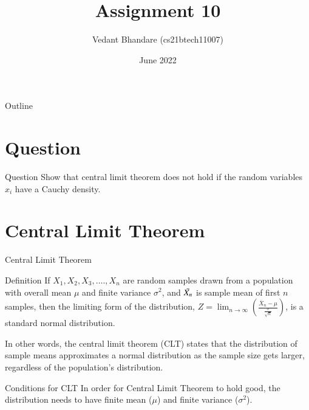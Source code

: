 \documentclass{beamer}
\title{Assignment 10}
\author{Vedant Bhandare (cs21btech11007)}
\date{June 2022}
\begin{document}
\begin{frame}
    \titlepage 
\end{frame}

\logo{}


\begin{frame}{Outline}
    \tableofcontents
\end{frame}

\section{Question}
\begin{frame}{Question}
    Show that central limit theorem does not hold if the random variables $x_i$ have a Cauchy density.
\end{frame}

\section{Central Limit Theorem}
\begin{frame}{Central Limit Theorem}
    \begin{block}{Definition}
    If $X_1, X_2, X_3, ...., X_n$ are random samples drawn from a population with overall mean $\mu$ and finite variance $\sigma^2$, and $\Bar{X_n}$ is sample mean of first $n$ samples, then the limiting form of the distribution, ${\textstyle Z=\lim _{n\to \infty }{\left({\frac {{\bar {X}}_{n}-\mu }{\frac {\sigma }{\sqrt {n}}}}\right)}}$, is a standard normal distribution. 
    \end{block}    
    In other words, the central limit theorem (CLT) states that the distribution of sample means approximates a normal distribution as the sample size gets larger, regardless of the population's distribution.
\end{frame}

\begin{frame}{Conditions for CLT}
    In order for Central Limit Theorem to hold good, the distribution needs to have finite mean ($\mu$) and finite variance ($\sigma^2$).
\end{frame}
\end{document}

